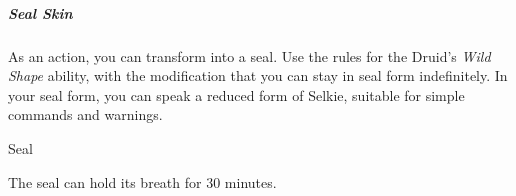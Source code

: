 \subparagraph{Seal Skin}
As an action, you can transform into a seal.
Use the rules for the Druid's \textit{Wild Shape} ability, with the modification that you can stay in seal form indefinitely.
In your seal form, you can speak a reduced form of Selkie, suitable for simple commands and warnings.

\begin{DndMonster}{Seal}
    \DndMonsterBasics[
        armor-class=12,
        hit-points=\DndDice{3d8+3},
        speed={10 ft., swim 60 ft.},
    ]
    \DndMonsterAbilityScores[
        str = 16,
        dex = 14,
        con = 13,
        int = 4,
        wis = 13,
        cha = 8,
    ]
    \DndMonsterDetails[
        challenge=1/2,
        damage-resistances=Cold
    ]

    The seal can hold its breath for 30 minutes.

    \DndMonsterAttack[
        name=Bite,
        distance=melee,
        mod=+3,
        dmg=\DndDice{2d6+3},
        dmg-type=piercing,
    ]
\end{DndMonster}
